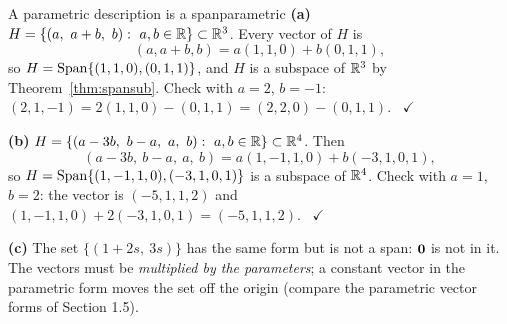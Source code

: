 \documentclass[11pt]{article}
\begin{document}
\begin{exmp}{A parametric description is a span}{parametric}
\textbf{(a)} $H=\{(a,\ a+b,\ b):\ a,b\in\mathbb{R}\}\subset\mathbb{R}^3$. Every vector of $H$ is
\[
(a,a+b,b)=a(1,1,0)+b(0,1,1),
\]
so $H=\operatorname{Span}\{(1,1,0),(0,1,1)\}$, and $H$ is a subspace of $\mathbb{R}^3$ by Theorem~\ref{thm:spansub}. Check with $a=2$, $b=-1$: $(2,1,-1)=2(1,1,0)-(0,1,1)=(2,2,0)-(0,1,1)$. \ $\checkmark$

\textbf{(b)} $H=\{(a-3b,\ b-a,\ a,\ b):\ a,b\in\R\}\subset\R^4$. Then
\[
(a-3b,\ b-a,\ a,\ b)=a(1,-1,1,0)+b(-3,1,0,1),
\]
so $H=\operatorname{Span}\{(1,-1,1,0),(-3,1,0,1)\}$ is a subspace of $\mathbb{R}^4$. Check with $a=1$, $b=2$: the vector is $(-5,1,1,2)$ and $(1,-1,1,0)+2(-3,1,0,1)=(-5,1,1,2)$. \ $\checkmark$

\textbf{(c)} The set $\{(1+2s,\ 3s)\}$ has the same form but is not a span: $\mathbf{0}$ is not in it. The vectors must be \emph{multiplied by the parameters}; a constant vector in the parametric form moves the set off the origin (compare the parametric vector forms of Section 1.5).
\end{exmp}
\end{document}
